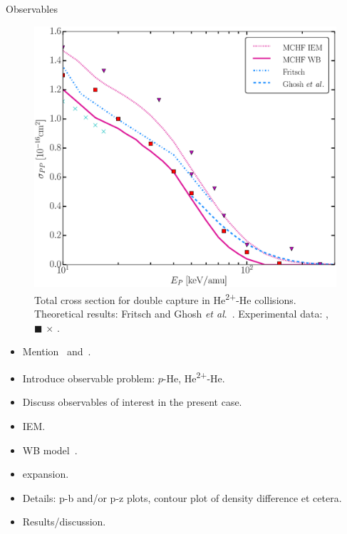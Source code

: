 \documentclass[letterpaper, 12 pt]{report}
\begin{document}
\begin{chapter}{Observables \label{chap:p-he2p-he}}
\begin{figure}[htp]
   \centering
   \includegraphics[width = \linewidth]{./images/he2phe/he2phe-PP.eps}
   \caption[Total cross section for double capture in He\textsuperscript{2+}-He
            collisions.]{Total cross section for double capture in He\textsuperscript{2+}-He
            collisions.
            Theoretical results: Fritsch \cite{Fritsch-94} and Ghosh \textit{et al}.\ \cite{GDMP-08}.
            Experimental data: {\color{RedViolet}{$\blacktriangledown$}}
            \cite{Dubois87}, {\color{red}$\blacksquare$} \cite{Rudd85}
            {\color{TealBlue}$\times$} \cite{SG74}. \label{fig:he2phe-pp}}
\end{figure}

   \begin{itemize}

      \item Mention~\cite{pbarhe} and~\cite{p-he2p-he}.
      
      \item Introduce observable problem: $p$-He, He\textsuperscript{2+}-He.

      \item Discuss observables of interest in the present case.

      \item IEM.

      \item WB model~\cite{wb}.

      \item expansion.

      \item Details: p-b and/or p-z plots, contour plot of density difference et cetera.

      \item Results/discussion.

   \end{itemize}

\end{chapter}
\end{document}
